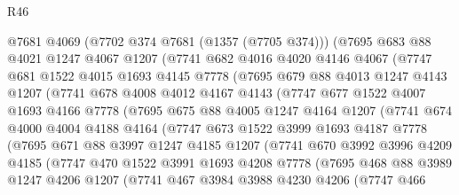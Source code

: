 \begin{lexlean}{R46}
\begin{coremodule}
      @7681
      @4069
      (@7702 @374 @7681 (@1357 (@7705 @374)))
      (@7695
        @683
        @88
        @4021
        @1247
        @4067
        @1207
        (@7741
          @682
          @4016
          @4020
          @4146
          @4067
          (@7747
            @681
            @1522
            @4015
            @1693
            @4145
            @7778
            (@7695
              @679
              @88
              @4013
              @1247
              @4143
              @1207
              (@7741
                @678
                @4008
                @4012
                @4167
                @4143
                (@7747
                  @677
                  @1522
                  @4007
                  @1693
                  @4166
                  @7778
                  (@7695
                    @675
                    @88
                    @4005
                    @1247
                    @4164
                    @1207
                    (@7741
                      @674
                      @4000
                      @4004
                      @4188
                      @4164
                      (@7747
                        @673
                        @1522
                        @3999
                        @1693
                        @4187
                        @7778
                        (@7695
                          @671
                          @88
                          @3997
                          @1247
                          @4185
                          @1207
                          (@7741
                            @670
                            @3992
                            @3996
                            @4209
                            @4185
                            (@7747
                              @470
                              @1522
                              @3991
                              @1693
                              @4208
                              @7778
                              (@7695
                                @468
                                @88
                                @3989
                                @1247
                                @4206
                                @1207
                                (@7741
                                  @467
                                  @3984
                                  @3988
                                  @4230
                                  @4206
                                  (@7747
                                    @466

\end{coremodule}
\end{lexlean}
